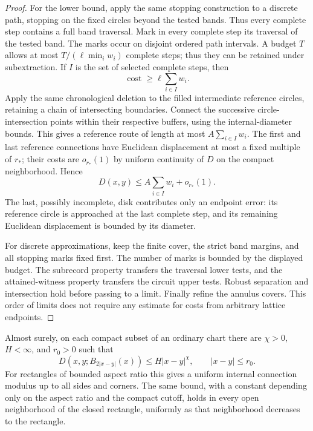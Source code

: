 \begin{proof}
For the lower bound, apply the same stopping construction to a discrete
path, stopping on the fixed circles beyond the tested bands.  Thus
every complete step contains a full band traversal.  Mark in every complete
step its traversal of the tested band.  The marks occur on disjoint
ordered path intervals.  A budget $T$ allows at most
$T/(\ell\min_i w_i)$ complete steps; thus they can be retained under
subextraction.  If $I$ is the set of selected complete steps, then
\[
 \operatorname{cost}\geq \ell\sum_{i\in I}w_i.
\]
Apply the same chronological deletion to the filled intermediate
reference circles, retaining a chain of intersecting boundaries.
Connect the successive circle-intersection points within their
respective buffers, using the internal-diameter bounds.  This gives
a reference route of length at most
$A\sum_{i\in I}w_i$.  The first and last reference connections have
Euclidean displacement at most a fixed multiple of $r_*$; their costs
are $o_{r_*}(1)$ by uniform continuity of $D$ on the compact
neighborhood.  Hence
\[
 D(x,y)\leq A\sum_{i\in I}w_i+o_{r_*}(1).
\]
The last, possibly incomplete, disk contributes only an endpoint error:
its reference circle is approached at the last complete step, and its
remaining Euclidean displacement is bounded by its diameter.

For discrete approximations, keep the finite cover, the strict band
margins, and all stopping marks fixed first.  The number of marks is
bounded by the displayed budget.  The subrecord property transfers the
traversal lower tests, and the attained-witness property transfers the
circuit upper tests.  Robust separation and intersection hold before
passing to a limit.  Finally refine the annulus covers.  This order of
limits does not require any estimate for costs from arbitrary lattice
endpoints.
\end{proof}

\begin{lemma}
\label{met:rect-access}
Almost surely, on each compact subset of an ordinary chart there are
$\chi>0$, $H<\infty$, and $r_0>0$ such that
\begin{equation}
 D(x,y;B_{2|x-y|}(x))\leq H|x-y|^\chi,
 \qquad |x-y|\leq r_0.
 \label{met:internal-holder}
\end{equation}
For rectangles of bounded aspect ratio this gives a uniform internal
connection modulus up to all sides and corners.  The same bound, with a
constant depending only on the aspect ratio and the compact cutoff,
holds in every open neighborhood of the closed rectangle, uniformly as
that neighborhood decreases to the rectangle.
\end{lemma}

